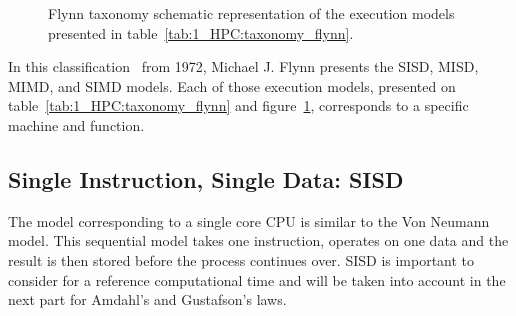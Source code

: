 \begin{table}
\centering
{}
\caption{Flynn's taxonomy presentation the execution models from Instructions and Data. The table is completed with SPMD and SIMT models.}
\label{tab:1_HPC:taxonomy_flynn}
\end{table}

\begin{figure}

\caption{Flynn taxonomy schematic representation of the execution models presented in table~\ref{tab:1_HPC:taxonomy_flynn}.}
\label{fig:1_HPC:flynn_taxonomy}
\end{figure}

In this classification~\cite{flynn1972some} from 1972, Michael J. Flynn presents the SISD, MISD, MIMD, and SIMD models.
Each of those execution models, presented on table~\ref{tab:1_HPC:taxonomy_flynn} and figure~\ref{fig:1_HPC:flynn_taxonomy}, corresponds to a specific machine and function.

\subsection{Single Instruction, Single Data: SISD}
The model corresponding to a single core CPU is similar to the Von Neumann model. 
This sequential model takes one instruction, operates on one data and the result is then stored before the process continues over. 
SISD is important to consider for a reference computational time and will be taken into account in the next part for Amdahl's and Gustafson's laws.

